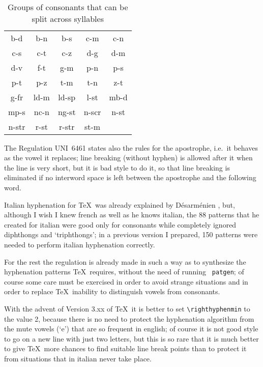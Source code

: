 \documentclass{ltugboat}
\begin{document}
\begin{table}{\centering\tt
\begin{tabular}{|*5{c|}}\hline
b-d  & b-n  & b-s  & c-m  & c-n  \\
c-s  & c-t  & c-z  & d-g  & d-m  \\
d-v  & f-t  & g-m  & p-n  & p-s  \\
p-t  & p-z  & t-m  & t-n  & z-t  \\
g-fr & ld-m & ld-sp& l-st & mb-d \\
mp-s & nc-n & ng-st& n-scr& n-st \\
n-str& r-st & r-str& st-m &      \\
\hline
\end{tabular}\par}
\caption{Groups    of   consonants  that  can  be  split  across  syllables}
\label{t:6461} 
 \end{table}

The  Regulation  UNI~6461 states also the rules for the apostrophe, i.e.\ it
behaves as the vowel it replaces; line breaking (without hyphen) is  allowed
after  it when the line is very short, but it is bad style to do it, so that
line breaking is eliminated if  no  interword  space  is  left  between  the
apostrophe  and  the  following  word.


Italian  hyphenation  for  \TeX\  was  already  explained by D\'esarm\'enien
\cite{desarmenien}, but, although I wish I knew french as well as  he  knows
italian,  the  88  patterns  that  he created for italian were good only for
consonants while completely  ignored  diphthongs  and  `triphthongs';  in  a
previous  version  I  prepared,  150 patterns were needed to perform italian
hyphenation correctly.

For  the  rest the regulation is already made in such a way as to synthesize
the hyphenation patterns \TeX\ requires, without the need  of  running  {\tt
patgen};  of  course  some  care must be exercised in order to avoid strange
situations and in order to replace \TeX\  inability  to  distinguish  vowels
from consonants.

With    the    advent  of  Version  3.xx  of  \TeX\  it  is  better  to  set
\verb"\righthyphenmin" to the value 2, because there is no need  to  protect
the hyphenation algorithm from the mute vowels (`e') that are so frequent in
english; of course it is not good style to go on a new line  with  just  two
letters,  but  this  is  so  rare  that it is much better to give \TeX\ more
chances to  find  suitable  line  break  points  than  to  protect  it  from
situations that in italian never take place.
\end{document}

